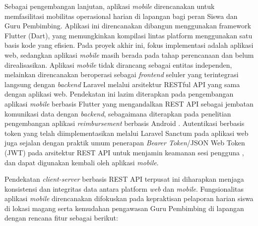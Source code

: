Sebagai pengembangan lanjutan, aplikasi \textit{mobile} direncanakan untuk memfasilitasi mobilitas operasional harian di lapangan bagi peran Siswa dan Guru Pembimbing. Aplikasi ini direncanakan dibangun menggunakan framework Flutter (Dart), yang memungkinkan kompilasi lintas platform menggunakan satu basis kode yang efisien. Pada proyek akhir ini, fokus implementasi adalah aplikasi web, sedangkan aplikasi \textit{mobile} masih berada pada tahap perencanaan dan belum direalisasikan. Aplikasi \textit{mobile} tidak dirancang sebagai entitas independen, melainkan direncanakan beroperasi sebagai \textit{frontend} seluler yang terintegrasi langsung dengan \textit{backend} Laravel melalui arsitektur RESTful API yang sama dengan aplikasi web. Pendekatan ini lazim diterapkan pada pengembangan aplikasi \textit{mobile} berbasis Flutter yang mengandalkan REST API sebagai jembatan komunikasi data dengan \textit{backend}, sebagaimana diterapkan pada penelitian pengembangan aplikasi \textit{reimbursement} berbasis Android \cite{ref16}. Autentikasi berbasis token yang telah diimplementasikan melalui Laravel Sanctum pada aplikasi web juga sejalan dengan praktik umum penerapan \textit{Bearer Token}/JSON Web Token (JWT) pada arsitektur REST API untuk menjamin keamanan sesi pengguna \cite{ref17}, dan dapat digunakan kembali oleh aplikasi \textit{mobile}.

Pendekatan \textit{client-server} berbasis REST API terpusat ini diharapkan menjaga konsistensi dan integritas data antara platform \textit{web} dan \textit{mobile}. Fungsionalitas aplikasi \textit{mobile} direncanakan difokuskan pada kepraktisan pelaporan harian siswa di lokasi magang serta kemudahan pengawasan Guru Pembimbing di lapangan dengan rencana fitur sebagai berikut:

